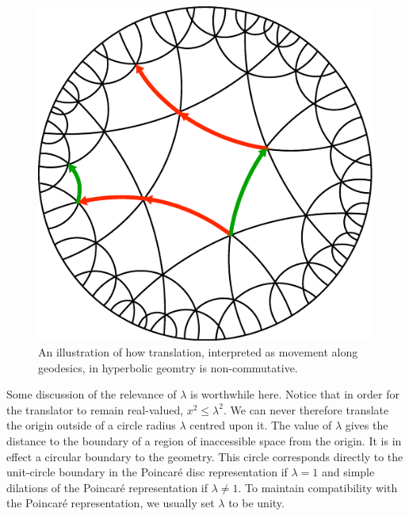 \begin{figure} \centering
\includegraphics[width=0.9\columnwidth]{circlimitgrid}
\caption{An illustration of how translation, interpreted as movement along
geodesics, in hyperbolic geomtry is non-commutative.
\label{fig:limitgrid}}
\end{figure}

Some discussion of the relevance of $\lambda$ is worthwhile here. Notice that
in order for the translator to remain real-valued, $x^2 \le \lambda^2$. 
We can never therefore translate the origin outside of a circle radius
$\lambda$ centred upon it. The value of $\lambda$ gives the distance to
the boundary of a region of inaccessible space from the origin. It is
in effect a circular boundary to the geometry. This circle corresponds
directly to the unit-circle boundary in the Poincar\'e disc representation if
$\lambda = 1$ and simple dilations of the Poincar\'e representation if
$\lambda \ne 1$. To maintain compatibility with the Poincar\'e representation,
we usually set $\lambda$ to be unity.

